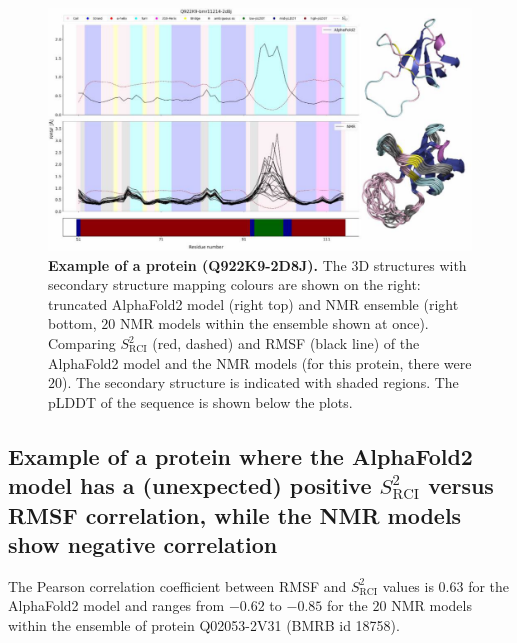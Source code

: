 \begin{figure}[H]
    \centering
    \includegraphics[width=\linewidth]{pLDDT//plddt_figures//supplementary_bhawna/supfig20.pdf}
    \caption{\textbf{Example of a protein (Q922K9-2D8J).} The 3D structures with secondary structure mapping colours are shown on the right: truncated AlphaFold2 model (right top) and NMR ensemble (right bottom, $20$ NMR models within the ensemble shown at once). Comparing $S_{\text{RCI}}^{2}$ (red, dashed) and RMSF (black line) of the AlphaFold2 model and the NMR models (for this protein, there were $20$). The secondary structure is indicated with shaded regions. The pLDDT of the sequence is shown below the plots.}
    \label{fig:plddt_sup:sup20}
\end{figure}

\subsection*{Example of a protein where the AlphaFold2 model has a (unexpected) positive $S_{\text{RCI}}^{2}$ versus RMSF correlation, while the NMR models show negative correlation}

The Pearson correlation coefficient between RMSF and $S_{\text{RCI}}^{2}$ values is $0.63$ for the AlphaFold2 model and ranges from $-0.62$ to $-0.85$ for the $20$ NMR models within the ensemble of protein Q02053-2V31 (BMRB id 18758).

